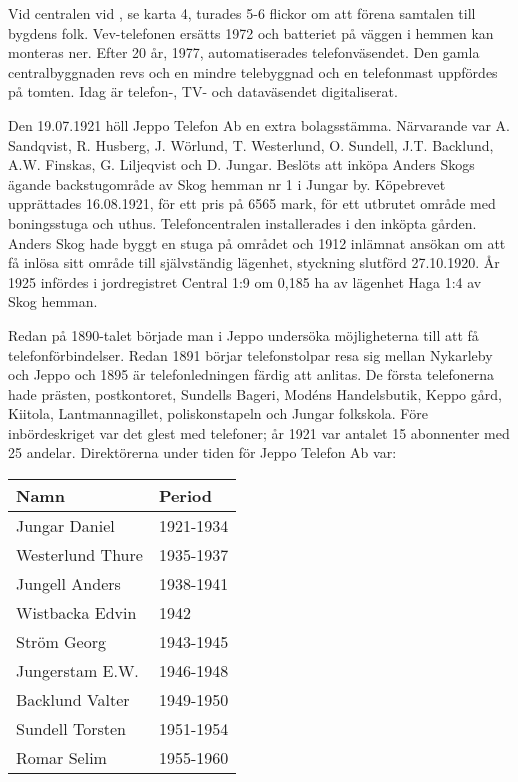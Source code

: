 Vid centralen vid , se karta 4, turades 5-6 flickor om att förena samtalen till bygdens folk.	Vev-telefonen ersätts 1972 och batteriet på väggen i hemmen kan monteras ner. Efter 20 år, 1977, automatiserades telefonväsendet. Den	gamla centralbyggnaden revs och en mindre telebyggnad och en telefonmast uppfördes på tomten. Idag är telefon-, TV- och dataväsendet digitaliserat.





Den 19.07.1921 höll Jeppo Telefon Ab en extra bolagsstämma.	Närvarande var A. Sandqvist, R. Husberg, J. Wörlund, T. Westerlund,	O. Sundell, J.T. Backlund, A.W. Finskas, G. Liljeqvist och D. Jungar.	Beslöts att inköpa Anders Skogs ägande backstugområde av Skog hemman nr 1 i Jungar by. Köpebrevet upprättades 16.08.1921, för ett	pris på 6565 mark, för ett utbrutet område med boningsstuga och uthus. Telefoncentralen installerades i den inköpta gården. Anders Skog hade byggt en stuga på området och 1912 inlämnat ansökan om att få inlösa sitt område till självständig lägenhet, styckning slutförd 27.10.1920. År 1925 infördes i jordregistret Central 1:9 om 0,185 ha av lägenhet Haga 1:4  av Skog hemman.

Redan på 1890-talet började man i Jeppo undersöka möjligheterna till att få telefonförbindelser. Redan 1891 börjar telefonstolpar resa sig mellan Nykarleby och Jeppo och 1895 är telefonledningen färdig att anlitas. De första telefonerna hade prästen, postkontoret, Sundells Bageri, Modéns Handelsbutik, Keppo gård, Kiitola, Lantmannagillet, poliskonstapeln och Jungar folkskola. Före inbördeskriget var det glest med telefoner; år 1921 var antalet 15 abonnenter med 25 andelar.
Direktörerna under tiden för Jeppo Telefon Ab var:

\begin{center}
  \begin{tabular}{l l}
    \hline
    Namn & Period \\ \hline
    Jungar Daniel & 1921-1934 \\
    Westerlund Thure & 1935-1937 \\
    Jungell Anders & 1938-1941 \\
    Wistbacka Edvin & 1942 \\
    Ström Georg & 1943-1945 \\
    Jungerstam E.W. & 1946-1948 \\
    Backlund Valter & 1949-1950 \\
    Sundell Torsten & 1951-1954 \\
    Romar Selim & 1955-1960 \\ \hline
  \end{tabular}
\end{center}


